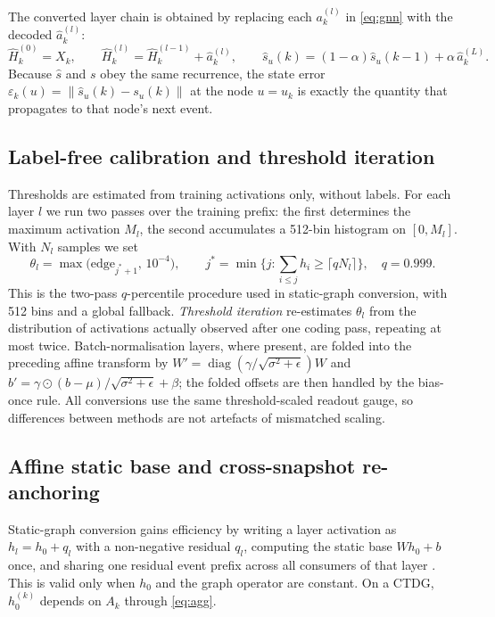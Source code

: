 \documentclass[preprint,12pt]{elsarticle}
\begin{document}
The converted layer chain is obtained by replacing each $a^{(l)}_k$ in \eqref{eq:gnn} with the decoded $\hat a^{(l)}_k$:
\begin{equation}
\hat H^{(0)}_k=X_k,\qquad \hat H^{(l)}_k=\hat H^{(l-1)}_k+\hat a^{(l)}_k,\qquad
\hat s_u(k)=(1-\alpha)\hat s_u(k-1)+\alpha\,\hat a^{(L)}_k.
\label{eq:snn}
\end{equation}
Because $\hat s$ and $s$ obey the same recurrence, the state error $\varepsilon_k(u)=\|\hat s_{u}(k)-s_{u}(k)\|$ at the node $u=u_k$ is exactly the quantity that propagates to that node's next event.

\subsection{Label-free calibration and threshold iteration}
\label{sec:calib}

Thresholds are estimated from training activations only, without labels. For each layer $l$ we run two passes over the training prefix: the first determines the maximum activation $M_l$, the second accumulates a 512-bin histogram on $[0,M_l]$. With $N_l$ samples we set
\begin{equation}
\theta_l=\max\Big(\mathrm{edge}_{j^\ast+1},\,10^{-4}\Big),\qquad
j^\ast=\min\Big\{j:\sum_{i\le j}h_i\ge\lceil q N_l\rceil\Big\},\quad q=0.999 .
\label{eq:theta}
\end{equation}
This is the two-pass $q$-percentile procedure used in static-graph conversion, with 512 bins and a global fallback. \emph{Threshold iteration} re-estimates $\theta_l$ from the distribution of activations actually observed after one coding pass, repeating at most twice. Batch-normalisation layers, where present, are folded into the preceding affine transform by $W'=\operatorname{diag}(\gamma/\sqrt{\sigma^2+\epsilon})W$ and $b'=\gamma\odot(b-\mu)/\sqrt{\sigma^2+\epsilon}+\beta$; the folded offsets are then handled by the bias-once rule. All conversions use the same threshold-scaled readout gauge, so differences between methods are not artefacts of mismatched scaling.

\subsection{Affine static base and cross-snapshot re-anchoring}
\label{sec:affine}

Static-graph conversion gains efficiency by writing a layer activation as $h_l=h_0+q_l$ with a non-negative residual $q_l$, computing the static base $Wh_0+b$ once, and sharing one residual event prefix across all consumers of that layer \cite{huang2025dcgs}. This is valid only when $h_0$ and the graph operator are constant. On a CTDG, $h_0^{(k)}$ depends on $A_k$ through \eqref{eq:agg}.
\end{document}
